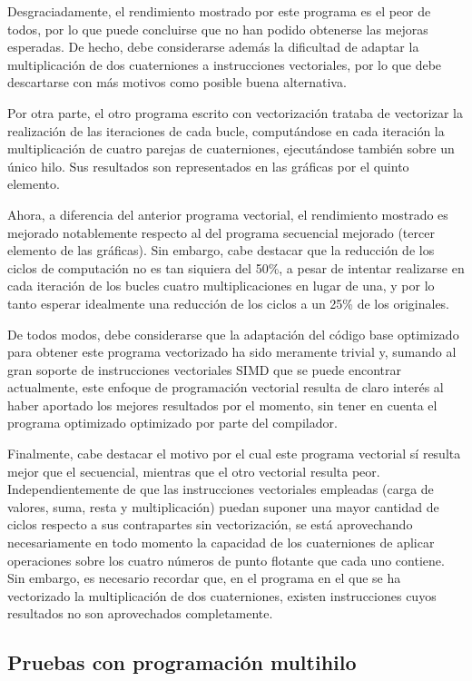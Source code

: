 \documentclass[conference]{IEEEtran}
\begin{document}
Desgraciadamente, el rendimiento mostrado por este programa es el peor de todos, por lo que puede concluirse que no han podido obtenerse las mejoras esperadas. De hecho, debe considerarse además la dificultad de adaptar la multiplicación de dos cuaterniones a instrucciones vectoriales, por lo que debe descartarse con más motivos como posible buena alternativa.

Por otra parte, el otro programa escrito con vectorización trataba de vectorizar la realización de las iteraciones de cada bucle, computándose en cada iteración la multiplicación de cuatro parejas de cuaterniones, ejecutándose también sobre un único hilo. Sus resultados son representados en las gráficas por el quinto elemento.

Ahora, a diferencia del anterior programa vectorial, el rendimiento mostrado es mejorado notablemente respecto al del programa secuencial mejorado (tercer elemento de las gráficas). Sin embargo, cabe destacar que la reducción de los ciclos de computación no es tan siquiera del 50\%, a pesar de intentar realizarse en cada iteración de los bucles cuatro multiplicaciones en lugar de una, y por lo tanto esperar idealmente una reducción de los ciclos a un 25\% de los originales.

De todos modos, debe considerarse que la adaptación del código base optimizado para obtener este programa vectorizado ha sido meramente trivial y, sumando al gran soporte de instrucciones vectoriales SIMD que se puede encontrar actualmente, este enfoque de programación vectorial resulta de claro interés al haber aportado los mejores resultados por el momento, sin tener en cuenta el programa optimizado optimizado por parte del compilador.

Finalmente, cabe destacar el motivo por el cual este programa vectorial sí resulta mejor que el secuencial, mientras que el otro vectorial resulta peor. Independientemente de que las instrucciones vectoriales empleadas (carga de valores, suma, resta y multiplicación) puedan suponer una mayor cantidad de ciclos respecto a sus contrapartes sin vectorización, se está aprovechando necesariamente en todo momento la capacidad de los cuaterniones de aplicar operaciones sobre los cuatro números de punto flotante que cada uno contiene. Sin embargo, es necesario recordar que, en el programa en el que se ha vectorizado la multiplicación de dos cuaterniones, existen instrucciones cuyos resultados no son aprovechados completamente.

\subsection{Pruebas con programación multihilo}
\end{document}
